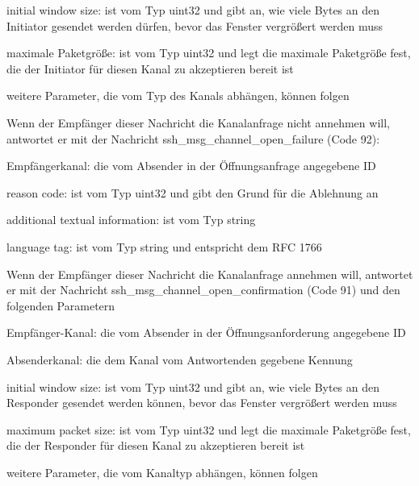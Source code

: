 \documentclass[a4paper]{article}
\begin{document}
\begin{multicols}{3}
\begin{itemize*}
\begin{itemize*}
\begin{itemize*}
                        \item initial window size: ist vom Typ uint32 und gibt an, wie viele Bytes an den Initiator gesendet werden dürfen, bevor das Fenster vergrößert werden muss
                        \item maximale Paketgröße: ist vom Typ uint32 und legt die maximale Paketgröße fest, die der Initiator für diesen Kanal zu akzeptieren bereit ist
                        \item weitere Parameter, die vom Typ des Kanals abhängen, können folgen
                  \end{itemize*}
                  \item Wenn der Empfänger dieser Nachricht die Kanalanfrage nicht annehmen will, antwortet er mit der Nachricht ssh\_msg\_channel\_open\_failure (Code 92):
                  \begin{itemize*}
                        \item Empfängerkanal: die vom Absender in der Öffnungsanfrage angegebene ID
                        \item reason code: ist vom Typ uint32 und gibt den Grund für die Ablehnung an
                        \item additional textual information: ist vom Typ string
                        \item language tag: ist vom Typ string und entspricht dem RFC 1766
                  \end{itemize*}
                  \item Wenn der Empfänger dieser Nachricht die Kanalanfrage annehmen will, antwortet er mit der Nachricht ssh\_msg\_channel\_open\_confirmation (Code 91) und den folgenden Parametern
                  \begin{itemize*}
                        \item Empfänger-Kanal: die vom Absender in der Öffnungsanforderung angegebene ID
                        \item Absenderkanal: die dem Kanal vom Antwortenden gegebene Kennung
                        \item initial window size: ist vom Typ uint32 und gibt an, wie viele Bytes an den Responder gesendet werden können, bevor das Fenster vergrößert werden muss
                        \item maximum packet size: ist vom Typ uint32 und legt die maximale Paketgröße fest, die der Responder für diesen Kanal zu akzeptieren bereit ist
                        \item weitere Parameter, die vom Kanaltyp abhängen, können folgen

\end{itemize*}
\end{itemize*}
\end{itemize*}
\end{multicols}
\end{document}
